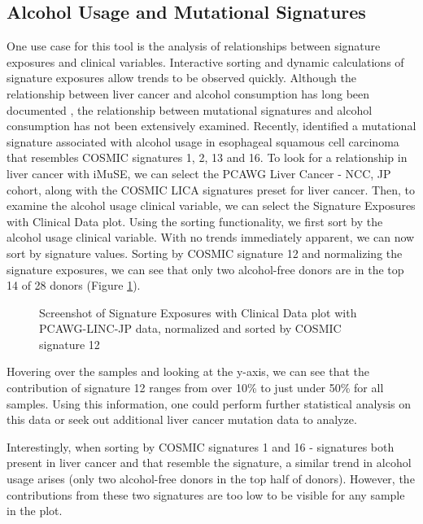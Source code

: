 \documentclass[12pt, letterpaper]{article}
\begin{document}
\subsection{Alcohol Usage and Mutational Signatures}
One use case for this tool is the analysis of relationships between signature exposures and clinical variables.
Interactive sorting and dynamic calculations of signature exposures allow trends to be observed quickly.
Although the relationship between liver cancer and alcohol consumption has long been documented \citep{bosch2004primary}, the relationship between mutational signatures and alcohol consumption has not been extensively examined.
Recently, \citet{li2018mutational} identified a mutational signature associated with alcohol usage in esophageal squamous cell carcinoma that resembles COSMIC signatures 1, 2, 13 and 16.
To look for a relationship in liver cancer with iMuSE, we can select the PCAWG Liver Cancer - NCC, JP cohort, along with the COSMIC LICA signatures preset for liver cancer. 
Then, to examine the alcohol usage clinical variable, we can select the Signature Exposures with Clinical Data plot.
Using the sorting functionality, we first sort by the alcohol usage clinical variable.
With no trends immediately apparent, we can now sort by signature values.
Sorting by COSMIC signature 12 and normalizing the signature exposures, we can see that only two alcohol-free donors are in the top 14 of 28 donors (Figure \ref{fig:caseStudy1_sig12}).
\begin{figure}[h]
    \centering
    \caption{Screenshot of Signature Exposures with Clinical Data plot with PCAWG-LINC-JP data, normalized and sorted by COSMIC signature 12}
    \label{fig:caseStudy1_sig12}
\end{figure}
Hovering over the samples and looking at the y-axis, we can see that the contribution of signature 12 ranges from over 10\% to just under 50\% for all samples.
Using this information, one could perform further statistical analysis on this data or seek out additional liver cancer mutation data to analyze.

Interestingly, when sorting by COSMIC signatures 1 and 16 - signatures both present in liver cancer and that resemble the \citet{li2018mutational} signature, a similar trend in alcohol usage arises (only two alcohol-free donors in the top half of donors).
However, the contributions from these two signatures are too low to be visible for any sample in the plot.
\end{document}
